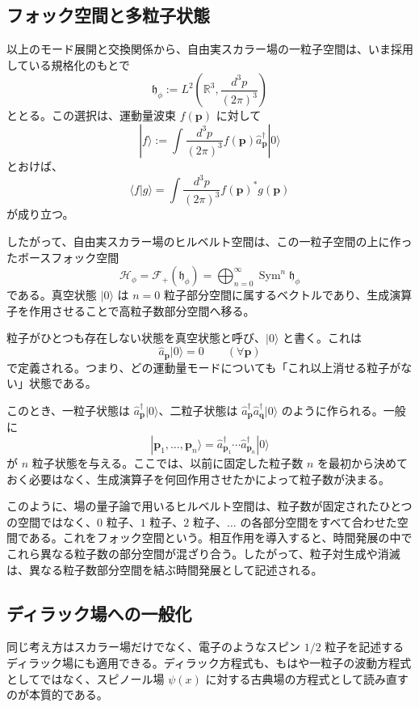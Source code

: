 \subsection{フォック空間と多粒子状態}
以上のモード展開と交換関係から、自由実スカラー場の一粒子空間は、いま採用している規格化のもとで
\[
\mathfrak{h}_\phi
:=
L^2\!\left(\mathbb{R}^3,\frac{d^3p}{(2\pi)^3}\right)
\]
ととる。この選択は、運動量波束 $f(\mathbf{p})$ に対して
\[
|f\rangle
:=
\int \frac{d^3p}{(2\pi)^3} f(\mathbf{p}) \hat{a}_{\mathbf{p}}^\dagger |0\rangle
\]
とおけば、
\[
\langle f|g\rangle
=
\int \frac{d^3p}{(2\pi)^3} f(\mathbf{p})^* g(\mathbf{p})
\]
が成り立つ。

したがって、自由実スカラー場のヒルベルト空間は、この一粒子空間の上に作ったボースフォック空間
\[
\mathcal{H}_\phi
=
\mathcal{F}_+(\mathfrak{h}_\phi)
=
\bigoplus_{n=0}^{\infty}\operatorname{Sym}^n \mathfrak{h}_\phi
\]
である。真空状態 $|0\rangle$ は $n=0$ 粒子部分空間に属するベクトルであり、生成演算子を作用させることで高粒子数部分空間へ移る。

粒子がひとつも存在しない状態を真空状態と呼び、$|0\rangle$ と書く。これは
\[
\hat{a}_{\mathbf{p}}|0\rangle = 0 \qquad (\forall \mathbf{p})
\]
で定義される。つまり、どの運動量モードについても「これ以上消せる粒子がない」状態である。

このとき、一粒子状態は $\hat{a}_{\mathbf{p}}^\dagger|0\rangle$、二粒子状態は $\hat{a}_{\mathbf{p}}^\dagger \hat{a}_{\mathbf{q}}^\dagger|0\rangle$ のように作られる。一般に
\[
|\mathbf{p}_1,\dots,\mathbf{p}_n\rangle
= \hat{a}_{\mathbf{p}_1}^\dagger \cdots \hat{a}_{\mathbf{p}_n}^\dagger |0\rangle
\]
が $n$ 粒子状態を与える。ここでは、以前に固定した粒子数 $n$ を最初から決めておく必要はなく、生成演算子を何回作用させたかによって粒子数が決まる。

このように、場の量子論で用いるヒルベルト空間は、粒子数が固定されたひとつの空間ではなく、$0$ 粒子、$1$ 粒子、$2$ 粒子、$\dots$ の各部分空間をすべて合わせた空間である。これをフォック空間という。相互作用を導入すると、時間発展の中でこれら異なる粒子数の部分空間が混ざり合う。したがって、粒子対生成や消滅は、異なる粒子数部分空間を結ぶ時間発展として記述される。

\subsection{ディラック場への一般化}
同じ考え方はスカラー場だけでなく、電子のようなスピン $1/2$ 粒子を記述するディラック場にも適用できる。ディラック方程式も、もはや一粒子の波動方程式としてではなく、スピノール場 $\psi(x)$ に対する古典場の方程式として読み直すのが本質的である。

